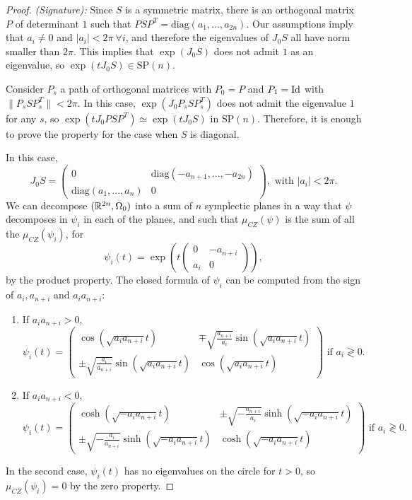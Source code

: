 \begin{proof} {\it (Signature):} Since $S$ is a symmetric matrix, there is an orthogonal matrix $P$ of determinant $1$ such that $PSP^T = \text{diag}(a_1,...,a_{2n})$. Our assumptions imply that $a_i \neq 0$ and $|a_i| < 2\pi \ \forall i$, and therefore the eigenvalues of $J_0 S$ all have norm smaller than $2\pi$. This implies that $\exp(J_0S)$ does not admit $1$ as an eigenvalue, so $\exp(tJ_0S) \in \text{SP}(n)$.

Consider $P_s$ a path of orthogonal matrices with $P_0=P$ and $P_1=\text{Id}$ with $\|P_sSP_s^T\| < 2\pi$. In this case, $\exp(J_0P_sSP_s^T)$ does not admit the eigenvalue $1$ for any $s$, so $\exp(tJ_0PSP^T) \simeq \exp(tJ_0S)$ in $\text{SP}(n)$. Therefore, it is enough to prove the property for the case when $S$ is diagonal.

In this case,
\[J_0S = \begin{pmatrix} 0 & \text{diag}(-a_{n+1},...,-a_{2n}) \\ \text{diag}(a_1,...,a_n) & 0 \end{pmatrix} , \text{ with } |a_i| < 2\pi .\]
We can decompose $(\mathbb{R}^{2n},\Omega_0)$ into a sum of $n$ symplectic planes in a way that $\psi$ decomposes in $\psi_i$ in each of the planes, and such that $\mu_{CZ}(\psi)$ is the sum of all the $\mu_{CZ}(\psi_i)$, for
\[\psi_i(t) = \exp\left(t\begin{pmatrix} 0 & -a_{n+i} \\ a_i & 0 \end{pmatrix}\right) ,\]
by the product property. The closed formula of $\psi_i$ can be computed from the sign of $a_i,a_{n+i}$ and $a_ia_{n+i}$:

\begin{enumerate}
	\item If $a_ia_{n+i} > 0$,
	\[\psi_i(t) = \begin{pmatrix} \cos(\sqrt{a_ia_{n+i}}t) & \mp \sqrt{\frac{a_{n+i}}{a_i}} \sin(\sqrt{a_ia_{n+i}}t) \\ \pm \sqrt{\frac{a_i}{a_{n+i}}} \sin(\sqrt{a_ia_{n+i}}t) & \cos(\sqrt{a_ia_{n+i}}t) \end{pmatrix} \text{ if } a_i \gtrless 0 .\]
	\item If $a_ia_{n+i} < 0$,
	\[\psi_i(t) = \begin{pmatrix} \cosh(\sqrt{-a_ia_{n+i}}t) & \pm \sqrt{-\frac{a_{n+i}}{a_i}} \sinh(\sqrt{-a_ia_{n+i}}t) \\ \pm \sqrt{-\frac{a_i}{a_{n+i}}} \sinh(\sqrt{-a_ia_{n+i}}t) & \cosh(\sqrt{-a_ia_{n+i}}t) \end{pmatrix} \text{ if } a_i \gtrless 0 .\]
\end{enumerate}
In the second case, $\psi_i(t)$ has no eigenvalues on the circle for $t>0$, so $\mu_{CZ}(\psi_i) = 0$ by the zero property.


\end{proof}

